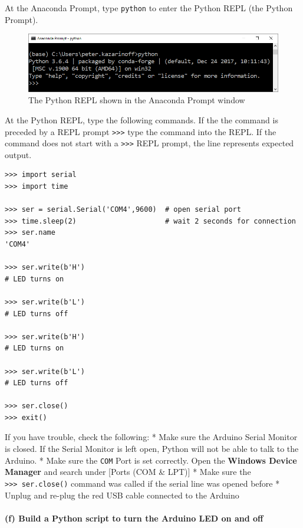 \documentclass[11pt]{article}
\begin{document}
At the Anaconda Prompt, type \texttt{python} to enter the Python REPL
(the Python Prompt).

\begin{figure}
\centering
\includegraphics{images/anaconda_prompt_python_REPL.png}
\caption{The Python REPL shown in the Anaconda Prompt window}
\end{figure}

At the Python REPL, type the following commands. If the the command is
preceded by a REPL prompt
\texttt{\textgreater{}\textgreater{}\textgreater{}} type the command
into the REPL. If the command does not start with a
\texttt{\textgreater{}\textgreater{}\textgreater{}} REPL prompt, the
line represents expected output.

\begin{verbatim}
>>> import serial
>>> import time

>>> ser = serial.Serial('COM4',9600)  # open serial port
>>> time.sleep(2)                     # wait 2 seconds for connection
>>> ser.name
'COM4'

>>> ser.write(b'H')
# LED turns on

>>> ser.write(b'L')
# LED turns off

>>> ser.write(b'H')
# LED turns on

>>> ser.write(b'L')
# LED turns off

>>> ser.close()
>>> exit()
\end{verbatim}

If you have trouble, check the following: * Make sure the Arduino Serial
Monitor is closed. If the Serial Monitor is left open, Python will not
be able to talk to the Arduino. * Make sure the
\texttt{\textquotesingle{}COM\textquotesingle{}} Port is set correctly.
Open the \textbf{Windows Device Manager} and search under {[}Ports (COM
\& LPT){]} * Make sure the
\texttt{\textgreater{}\textgreater{}\textgreater{}\ ser.close()} command
was called if the serial line was opened before * Unplug and re-plug the
red USB cable connected to the Arduino

    \hypertarget{f-build-a-python-script-to-turn-the-arduino-led-on-and-off}{%
\paragraph{(f) Build a Python script to turn the Arduino LED on and
off}\label{f-build-a-python-script-to-turn-the-arduino-led-on-and-off}}
\end{document}
